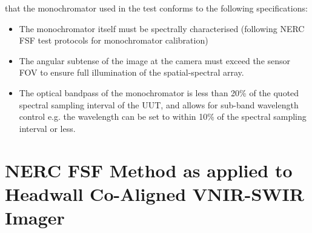 \documentclass[nohyper,nobib]{tufte-book}
\begin{document}
 that the monochromator used in the test conforms to the following specifications:
\begin{itemize}
	\item The monochromator itself must be spectrally characterised (following NERC FSF test protocols for monochromator calibration)
	\item The angular subtense of the image at the camera must exceed the sensor FOV to ensure full illumination of the spatial-spectral array. 
	\item The optical bandpass of the monochromator is less than 20\% of the quoted spectral sampling interval of the UUT, and allows for sub-band wavelength control e.g. the wavelength can be set to within 10\% of the spectral sampling interval or less.
\end{itemize}

\section{NERC FSF Method as applied to Headwall Co-Aligned VNIR-SWIR Imager}
\end{document}
